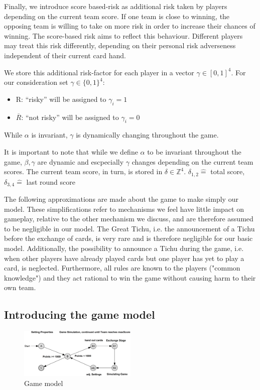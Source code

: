 Finally, we introduce score based-risk as additional risk taken by players depending on the current team score. If one team is close to winning, the opposing team is willing to take on more risk in order to increase their chances of winning. The score-based risk aims to reflect this behaviour. Different players may treat this risk differently, depending on their personal risk adverseness independent of their current card hand.

 We store this additional risk-factor for each player in a vector $\gamma \in [0,1]^4$. For our consideration set  $\gamma \in \{0,1\}^4$: \\
\begin{itemize}
\item R: “risky” will be assigned to $\gamma_i = 1$
\item $\overline{R}$: “not risky” will be assigned to $\gamma_i = 0$ \\
\end{itemize}
While $\alpha$ is invariant, $\gamma$ is dynamically changing throughout the game. 

It is important to note that while we define $\alpha$ to be invariant throughout the game, $\beta,\gamma$ are dynamic and escpecially $\gamma$ changes depending on the current team scores. The current team score, in turn, is stored in $\delta \in \mathbb{Z}^4$. 
$\delta_{1,2} \widehat{=}$ total score, $\delta_{3,4} \widehat{=}$ last round score

The following approximations are made about the game to make simply our model. These simplifications refer to mechanisms we feel have little impact on gameplay, relative to the other mechanism we discuss, and are therefore assumed to be negligible in our model. The Great Tichu, i.e. the announcement of a Tichu before the exchange of cards, is very rare and is therefore negligible for our basic model. Additionally, the possibility to announce a Tichu during the game, i.e. when other players have already played cards but one player has yet to play a card, is neglected. Furthermore, all rules are known to the players ("common knowledge") and they act rational to win the game without causing harm to their own team.

\subsection{Introducing the game model}

\begin{figure}[h]
    \centering
    \includegraphics[width=0.5\textwidth]{Bilder/graph}
    \caption{Game model}
    \label{fig:meine-grafik}
\end{figure}

